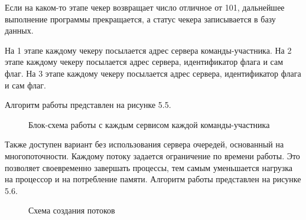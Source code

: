 Если на каком-то этапе чекер возвращает число отличное от 101, дальнейшее выполнение программы прекращается, а статус чекера записывается в базу данных.

На 1 этапе каждому чекеру посылается адрес сервера команды-участника. 
На 2 этапе каждому чекеру посылается адрес сервера, идентификатор флага и сам флаг. 
На 3 этапе каждому чекеру посылается адрес сервера, идентификатор флага и сам флаг.

Алгоритм работы представлен на рисунке 5.5.
\begin{figure}[ht!]
\caption{Блок-схема работы с каждым сервисом каждой команды-участника}
\end{figure}

Также доступен вариант без использования сервера очередей, основанный на многопоточности. Каждому потоку задается ограничение по времени работы. Это позволяет своевременно завершать процессы, тем самым уменьшается нагрузка на процессор и на потребление памяти. Алгоритм работы представлен на рисунке 5.6. 

\begin{figure}[ht!]
\caption{Схема создания потоков}
\end{figure}
